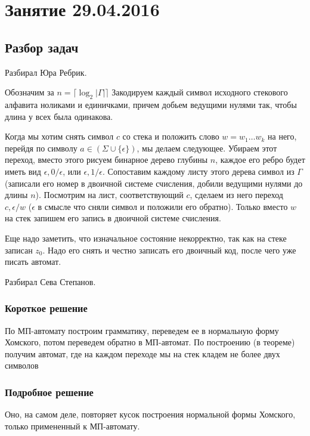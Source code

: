 \chapter{Занятие 29.04.2016}
\section{Разбор задач}

Разбирал Юра Ребрик.

Обозначим за $n = \lceil \log_2 |\Gamma| \rceil$ 
Закодируем каждый символ исходного стекового алфавита ноликами и единичками, причем добьем ведущими нулями так, чтобы длина у всех была одинакова.

Когда мы хотим снять символ $c$ со стека и положить слово $w = w_1 \dots w_k$ на него, перейдя по символу $a \in (\Sigma \cup \{\epsilon\})$, мы делаем следующее.
Убираем этот переход, вместо этого рисуем бинарное дерево глубины $n$, каждое его ребро будет иметь вид $\epsilon, 0/\epsilon$, или $\epsilon, 1/\epsilon$. 
Сопоставим каждому листу этого дерева символ из $\Gamma$ (записали его номер в двоичной системе счисления, добили ведущими нулями до длины $n$).
Посмотрим на лист, соответствующий $c$, сделаем из него переход $c, \epsilon/w$ ($\epsilon$ в смысле что сняли символ и положили его обратно).
Только вместо $w$ на стек запишем его запись в двоичной системе счисления.

Еще надо заметить, что изначальное состояние некорректно, так как на стеке записан $z_0$. Надо его снять и честно записать его двоичный код, после чего уже писать автомат. 


Разбирал Сева Степанов.

\subsection{Короткое решение}           

По МП-автомату построим грамматику, переведем ее в нормальную форму Хомского, потом переведем обратно в МП-автомат.
По построению (в теореме) получим автомат, где на каждом переходе мы на стек кладем не более двух символов

\subsection{Подробное решение}
Оно, на самом деле, повторяет кусок построения нормальной формы Хомского, только примененный к МП-автомату.

